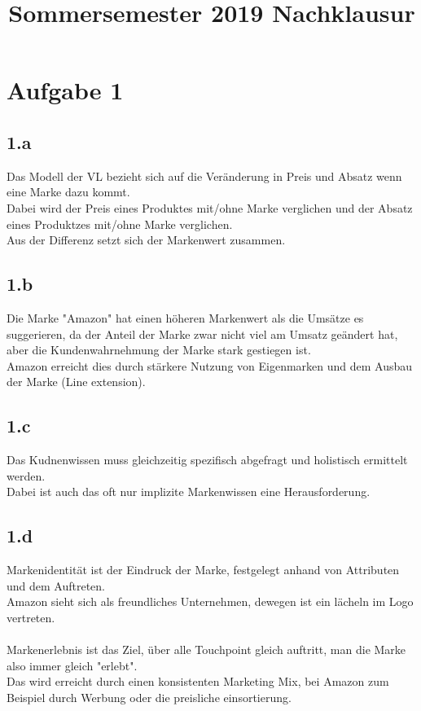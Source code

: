 

\title{Sommersemester 2019 Nachklausur}
\maketitle


\section{Aufgabe 1}
\subsection{1.a}
    Das Modell der VL bezieht sich auf die Veränderung in Preis und Absatz wenn eine Marke dazu kommt. \\
    Dabei wird der Preis eines Produktes mit/ohne Marke verglichen und der Absatz eines Produktzes mit/ohne Marke verglichen. \\
    Aus der Differenz setzt sich der Markenwert zusammen.

\subsection{1.b}
    Die Marke "Amazon" hat einen höheren Markenwert als die Umsätze es suggerieren, da der Anteil der Marke zwar nicht viel am Umsatz geändert hat, aber die Kundenwahrnehmung der Marke stark gestiegen ist. \\
    Amazon erreicht dies durch stärkere Nutzung von Eigenmarken und dem Ausbau der Marke (Line extension).

\subsection{1.c}
    Das Kudnenwissen muss gleichzeitig spezifisch abgefragt und holistisch ermittelt werden. \\
    Dabei ist auch das oft nur implizite Markenwissen eine Herausforderung.

\subsection{1.d}
    Markenidentität ist der Eindruck der Marke, festgelegt anhand von Attributen und dem Auftreten. \\
    Amazon sieht sich als freundliches Unternehmen, dewegen ist ein lächeln im Logo vertreten.\\
    \ \\
    Markenerlebnis ist das Ziel, über alle Touchpoint gleich auftritt, man die Marke also immer gleich "erlebt". \\
    Das wird erreicht durch einen konsistenten Marketing Mix, bei Amazon zum Beispiel durch Werbung oder die preisliche einsortierung. \\

